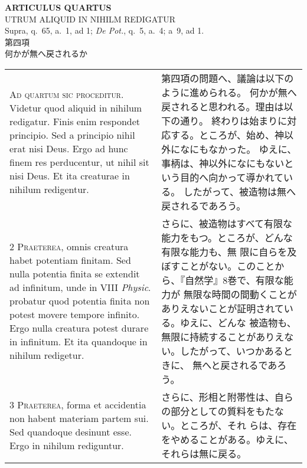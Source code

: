 \documentclass[10pt]{jsarticle} %
\begin{document}
\begin{center}
 {\Large {\bf ARTICULUS QUARTUS}}\\
 {\large UTRUM ALIQUID IN NIHILM REDIGATUR}\\
 {\footnotesize Supra, q.~65, a.~1, ad 1; {\itshape De Pot.}, q.~5,
 a.~4; a~9, ad 1.}\\
 {\Large 第四項\\何かが無へ戻されるか}
\end{center}

\begin{longtable}{p{21em}p{21em}}


{\huge A}{\scshape d quartum sic proceditur}. Videtur quod
aliquid in nihilum redigatur. Finis enim respondet principio. Sed a
principio nihil erat nisi Deus. Ergo ad hunc finem res perducentur, ut
nihil sit nisi Deus. Et ita creaturae in nihilum redigentur.

&

第四項の問題へ、議論は以下のように進められる。
何かが無へ戻されると思われる。理由は以下の通り。
終わりは始まりに対応する。ところが、始め、神以外になにもなかった。
ゆえに、事柄は、神以外になにもないという目的へ向かって導かれている。
したがって、被造物は無へ戻されるであろう。

\\


{\scshape 2 Praeterea}, omnis creatura habet potentiam
finitam. Sed nulla potentia finita se extendit ad infinitum, unde in
VIII {\itshape Physic}. probatur quod potentia finita non potest movere tempore
infinito. Ergo nulla creatura potest durare in infinitum. Et ita
quandoque in nihilum redigetur.

&


さらに、被造物はすべて有限な能力をもつ。ところが、どんな有限な能力も、無
 限に自らを及ぼすことがない。このことから、『自然学』8巻で、有限な能力が
 無限な時間の間動くことがありえないことが証明されている。ゆえに、どんな
 被造物も、無限に持続することがありえない。したがって、いつかあるときに、
 無へと戻されるであろう。

\\


{\scshape 3 Praeterea}, forma et accidentia non habent
materiam partem sui. Sed quandoque desinunt esse. Ergo in nihilum
rediguntur.

&

さらに、形相と附帯性は、自らの部分としての質料をもたない。ところが、それ
 らは、存在をやめることがある。ゆえに、それらは無に戻る。


\end{longtable}
\end{document}
